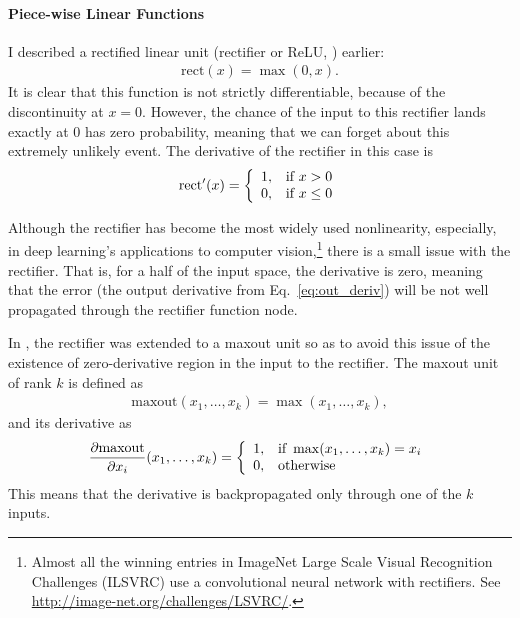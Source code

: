 \documentclass{report}
\newcommand{\rect}{\text{rect}}
\newcommand{\maxout}{\text{maxout}}
\begin{document}
\paragraph{Piece-wise Linear Functions}

I described a rectified linear unit (rectifier or ReLU,
\cite{nair2010rectified,glorot2011deep}) earlier:
\begin{align*}
    \rect(x) = \max(0, x).
\end{align*}
It is clear that this function is not strictly differentiable, because of the
discontinuity at $x=0$. However, the chance of the input to this rectifier lands
exactly at $0$ has zero probability, meaning that we can forget about this
extremely unlikely event. The derivative of the rectifier in this case is
\begin{align*}
    \rect'(x) = \left\{ 
        \begin{array}{l l}
            1, & \text{if }x > 0 \\
            0, & \text{if }x \leq 0
        \end{array}
        \right.
\end{align*}

Although the rectifier has become the most widely used nonlinearity, especially,
in deep learning's applications to computer vision,\footnote{
    Almost all the winning entries in ImageNet Large Scale Visual Recognition
    Challenges (ILSVRC) use a convolutional neural network with rectifiers. See
    \url{http://image-net.org/challenges/LSVRC/}.
}
there is a small issue with the rectifier. That is, for a half of the input
space, the derivative is zero, meaning that the error (the output derivative
from Eq.~\eqref{eq:out_deriv}) will be not well propagated through the rectifier
function node.

In \cite{goodfellow2013maxout}, the rectifier was extended to a maxout unit so
as to avoid this issue of the existence of zero-derivative region in the input
to the rectifier. The maxout unit of rank $k$ is defined as
\begin{align*}
    \maxout(x_1, \ldots, x_k) = \max(x_1, \ldots, x_k),
\end{align*}
and its derivative as
\begin{align*}
    \frac{\partial \maxout}{\partial x_i}(x_1, \dots, x_k) = 
    \left\{
        \begin{array}{l l}
            1, & \text{if } \max(x_1, \ldots, x_k) = x_i \\
            0, & \text{otherwise}
        \end{array}
        \right.
\end{align*}
This means that the derivative is backpropagated only through one of the $k$
inputs.
\end{document}
